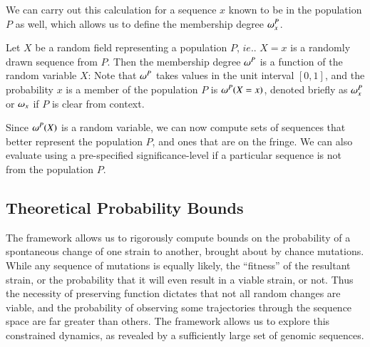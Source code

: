 {We can carry out this calculation for a sequence $x$  known to be in the population $P$ as well, which allows us to define the membership degree $\omega^P_x$.
\begin{defn}
Let $X$ be a random field representing a population $P$, $ie.$. $X=x$ is a randomly drawn sequence from $P$. Then  the membership degree $\omega^P$ is  a function of the random variable $X$: 
Note that $\omega^P$ takes values in the unit interval $[0,1]$, and the probability  $x$ is a member of the population $P$ is $\omega^P(X=x)$, denoted briefly as $\omega_{x}^P$ or $\omega_{x}$ if $P$ is clear from context.
\end{defn}
Since $\omega^P(X)$ is a random variable, we can now compute sets of sequences that better represent the population $P$, and ones that are on the fringe. We can also evaluate using a pre-specified significance-level if a particular sequence is not from the population $P$.%
%



\subsection*{Theoretical Probability Bounds}

The \enet framework  allows us to rigorously compute bounds on the probability of a spontaneous change of one strain to another, brought about by chance mutations. While any sequence of mutations is equally likely, the ``fitness'' of the resultant strain, or the probability that it will even result in a viable strain, or not. Thus the necessity of preserving  function  dictates that not all random changes  are viable, and the probability of observing some trajectories through the sequence space  are far greater  than others. The \enet framework allows us to explore this constrained dynamics, as revealed by a sufficiently large set of genomic sequences.

}
